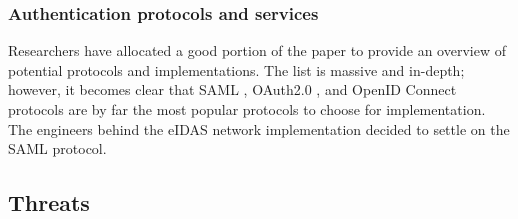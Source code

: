 \subsubsection{Authentication protocols and services}

Researchers have allocated a good portion of the paper to provide an overview of potential protocols and implementations. The list is massive and in-depth; however, it becomes clear that SAML \cite{saml}, OAuth2.0 \cite{rfc6749}, and OpenID Connect \cite{oidc} protocols are by far the most popular protocols to choose for implementation. The engineers behind the eIDAS network implementation decided to settle on the SAML protocol.






\subsection{Threats}


